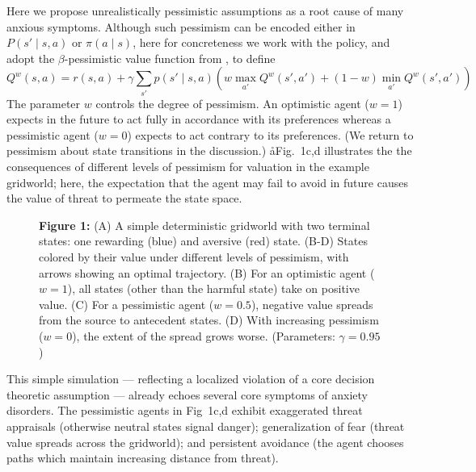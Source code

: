 \documentclass[11pt]{article} %
\begin{document}
Here we propose unrealistically pessimistic assumptions as a root cause of many anxious symptoms. Although such pessimism can be encoded either in $P(s' \mid s,a)$ or $\pi(a \mid s)$, here for concreteness we work with the policy, and adopt the $\beta$-pessimistic value function from \cite{Gaskett2003}, to define
\begin{equation*}
Q^w(s,a) = r(s,a) + \gamma \sum_{s'} p(s' \mid s,a) \left( w \max_{a'} Q^w(s',a') + (1 - w) \min_{a'} Q^w(s',a') \right)
\end{equation*}
The parameter $w$ controls the degree of pessimism. An optimistic agent ($w = 1$) expects in the future to act fully in accordance with its preferences whereas a pessimistic agent ($w = 0$) expects to act contrary to its preferences. (We return to pessimism about state transitions in the discussion.) åFig.~1c,d illustrates the the consequences of different levels of pessimism for valuation in the example gridworld; here, the expectation that the agent may fail to avoid in future causes the value of threat to permeate the state space.

\begin{figure}
  \centerline{%
  }
  \par \textbf{Figure 1:} (A) A simple deterministic gridworld with two terminal states: one rewarding (blue) and aversive (red) state. (B-D) States colored by their value under different levels of pessimism, with arrows showing an optimal trajectory. (B) For an optimistic agent ($w=1$), all states (other than the harmful state) take on positive value. (C) For a pessimistic agent ($w=0.5$), negative value spreads from the source to antecedent states. (D) With increasing pessimism ($w=0$), the extent of the spread grows worse. (Parameters: $\gamma = 0.95$)
\end{figure}

This simple simulation --- reflecting a localized violation of a core decision theoretic assumption --- already echoes several core symptoms of anxiety disorders. The pessimistic agents in Fig~1c,d exhibit exaggerated threat appraisals (otherwise neutral states signal danger); generalization of fear (threat value spreads across the gridworld); and persistent avoidance (the agent chooses paths which maintain increasing distance from threat).
\end{document}
